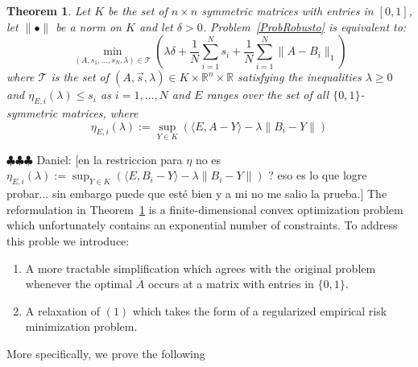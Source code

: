 \documentclass[12pt]{amsart}
\newtheorem{theorem}[lemma]{Theorem}
\theoremstyle{remark}
\newcommand{\RR}{\mathbb{R}}
\newcommand{\ddr}[1]{{\color{blue} \sf $\clubsuit\clubsuit\clubsuit$ Daniel: [#1]}}
\begin{document}
\begin{theorem}\label{thm: finiteConvex} Let $K$ be the set of $n\times n$ symmetric matrices with entries in $[0,1]$, let $\|\bullet\|$ be a norm on $K$ and let $\delta>0$. Problem~\ref{ProbRobusto} is equivalent to:
\[\min_{(A,s_1,\dots, s_N,\lambda)\in \mathcal{T}}\left( \lambda\delta +\frac{1}{N}\sum_{i=1}^N s_i + \frac{1}{N}\sum_{i=1}^N \|A-B_i\|_1\right)\]
where $\mathcal{T}$ is the set of $(A,\vec{s},\lambda)\in K\times \RR^n\times \RR$  satisfying the inequalities $\lambda\geq 0$ and $\eta_{E, i}(\lambda)\leq s_i$ as $i=1,\dots, N$ and $E$ ranges over the set of all $\{0,1\}$-symmetric matrices, where
\[\eta_{E, i}(\lambda):= \sup_{Y\in K} \left(\langle E, A-Y\rangle -\lambda \|B_i-Y\|\right)\]
\end{theorem}

\ddr{en la restriccion para $\eta$  no es $\eta_{E, i}(\lambda):= \sup_{Y\in K} \left(\langle E, B_i-Y\rangle -\lambda \|B_i-Y\|\right)$ ? eso es lo que logre probar... sin embargo puede que esté bien y a mi no me salio la prueba.}
The reformulation in Theorem~\ref{thm: finiteConvex} is a finite-dimensional convex optimization problem which unfortunately contains  an exponential number of constraints. To address this proble we introduce:
\begin{enumerate}
\item A more tractable simplification which agrees with the original problem whenever the optimal $\overline{A}$ occurs at a matrix with entries in $\{0,1\}$.
\item A relaxation of $(1)$ which takes the form of a regularized empirical risk minimization problem.
\end{enumerate}
More specifically, we prove the following 
\end{document}
